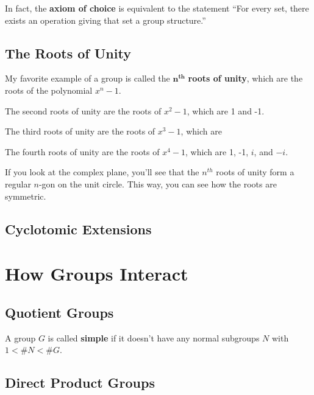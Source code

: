 In fact, the \textbf{axiom of choice} is equivalent to the statement ``For every set, there exists an operation giving that set a group structure.''

\subsection{The Roots of Unity}

My favorite example of a group is called the $\mathbf{n^{th}}$ \textbf{roots of unity}, which are the roots of the polynomial $x^n - 1$.

\begin{example}
    The second roots of unity are the roots of $x^2 - 1$, which are 1 and -1.
\end{example}

\begin{example}
    The third roots of unity are the roots of $x^3 - 1$, which are
\end{example}

\begin{example}
    The fourth roots of unity are the roots of $x^4 - 1$, which are 1, -1, $i$, and $-i$.
\end{example}

If you look at the complex plane, you'll see that the $n^{th}$ roots of unity form a regular $n$-gon on the unit circle. This way, you can see how the roots are symmetric.

\subsection{Cyclotomic Extensions}

\section{How Groups Interact}

\subsection{Quotient Groups}

\begin{definition}
    A group $G$ is called \textbf{simple} if it doesn't have any normal subgroups $N$ with $1 < \#N < \#G$.
\end{definition}

\subsection{Direct Product Groups}

